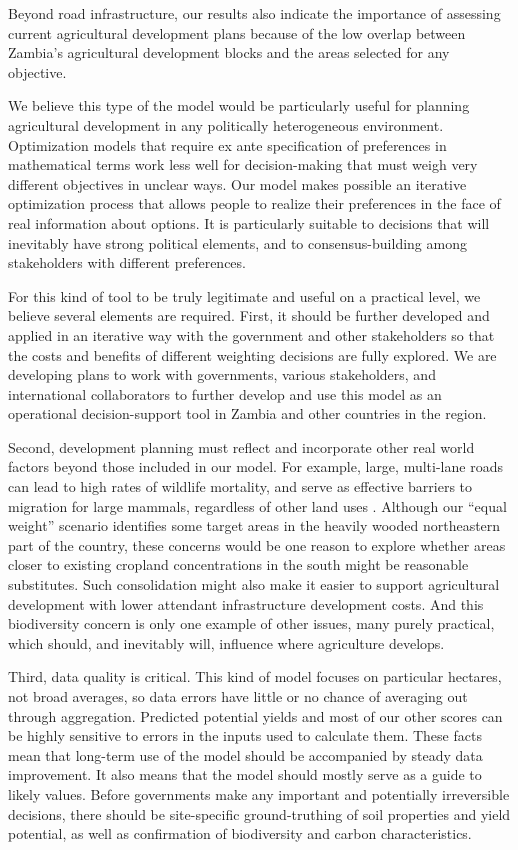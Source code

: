 \documentclass[a4paper]{article}
\begin{document}
{Beyond road infrastructure, our results also indicate the importance of assessing current agricultural development plans because of the low overlap between Zambia's agricultural development blocks and the areas selected for any objective. 

We believe this type of the model would be particularly useful for planning agricultural development in any politically heterogeneous environment. Optimization models that require ex ante specification of preferences in mathematical terms work less well for decision-making that must weigh very different objectives in unclear ways.  Our model makes possible an iterative optimization process that allows people to realize their preferences in the face of real information about options.  It is particularly suitable to decisions that will inevitably have strong political elements, and to consensus-building among stakeholders with different preferences.  

For this kind of tool to be truly legitimate and useful on a practical level, we believe several elements are required. First, it should be further developed and applied in an iterative way with the government and other stakeholders so that the costs and benefits of different weighting decisions are fully explored. We are developing plans to work with governments, various stakeholders, and international collaborators to further develop and use this model as an operational decision-support tool in Zambia and other countries in the region.

Second, development planning must reflect and incorporate other real world factors beyond those included in our model. For example, large, multi-lane roads can lead to high rates of wildlife mortality, and serve as effective barriers to migration for large mammals, regardless of other land uses \citep{holdo_predicted_2011}.  Although our ``equal weight'' scenario identifies some target areas in the heavily wooded northeastern part of the country, these concerns would be one reason to explore whether areas closer to existing cropland concentrations in the south might be reasonable substitutes. Such consolidation might also make it easier to support agricultural development with lower attendant infrastructure development costs.  And this biodiversity concern is only one example of other issues, many purely practical, which should, and inevitably will, influence where agriculture develops.   
 
Third, data quality is critical. This kind of model focuses on particular hectares, not broad averages, so data errors have little or no chance of averaging out through aggregation. Predicted potential yields and most of our other scores can be highly sensitive to errors in the inputs used to calculate them. These facts mean that long-term use of the model should be accompanied by steady data improvement.  It also means that the model should mostly serve as a guide to likely values. Before governments make any important and potentially irreversible decisions, there should be site-specific ground-truthing of soil properties and yield potential, as well as confirmation of biodiversity and carbon characteristics. 
 
}
\end{document}
